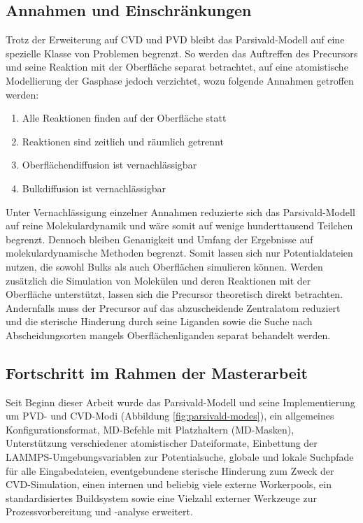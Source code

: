 \subsection{Annahmen und Einschränkungen}

Trotz der Erweiterung auf CVD und PVD bleibt das Parsivald-Modell auf eine spezielle Klasse von Problemen begrenzt.
So werden das Auftreffen des Precursors und seine Reaktion mit der Oberfläche separat betrachtet, auf eine atomistische Modellierung der Gasphase jedoch verzichtet, wozu folgende Annahmen getroffen werden:

\begin{enumerate}
\item Alle Reaktionen finden auf der Oberfläche statt
\item Reaktionen sind zeitlich und räumlich getrennt
\item Oberflächendiffusion ist vernachlässigbar
\item Bulkdiffusion ist vernachlässigbar
\end{enumerate}

Unter Vernachlässigung einzelner Annahmen reduzierte sich das Parsivald-Modell auf reine Molekulardynamik und wäre somit auf wenige hunderttausend Teilchen begrenzt.
Dennoch bleiben Genauigkeit und Umfang der Ergebnisse auf molekulardynamische Methoden begrenzt.
Somit lassen sich nur Potentialdateien nutzen, die sowohl Bulks als auch Oberflächen simulieren können.
Werden zusätzlich die Simulation von Molekülen und deren Reaktionen mit der Oberfläche unterstützt, lassen sich die Precursor theoretisch direkt betrachten.
Andernfalls muss der Precursor auf das abzuscheidende Zentralatom reduziert und die sterische Hinderung durch seine Liganden sowie die Suche nach Abscheidungsorten mangels Oberflächenliganden separat behandelt werden.

\subsection{Fortschritt im Rahmen der Masterarbeit}

Seit Beginn dieser Arbeit wurde das Parsivald-Modell und seine Implementierung um PVD- und CVD-Modi (Abbildung \ref{fig:parsivald-modes}), ein allgemeines Konfigurationsformat, MD-Befehle mit Platzhaltern (MD-Masken), Unterstützung verschiedener atomistischer Dateiformate, Einbettung der LAMMPS-Umgebungs\-variablen zur Potentialsuche, globale und lokale Suchpfade für alle Eingabedateien, eventgebundene sterische Hinderung zum Zweck der CVD-Simu\-lation, einen internen und beliebig viele externe Workerpools, ein standardisiertes Buildsystem sowie eine Vielzahl externer Werkzeuge zur Prozessvorbereitung und -analyse erweitert.

